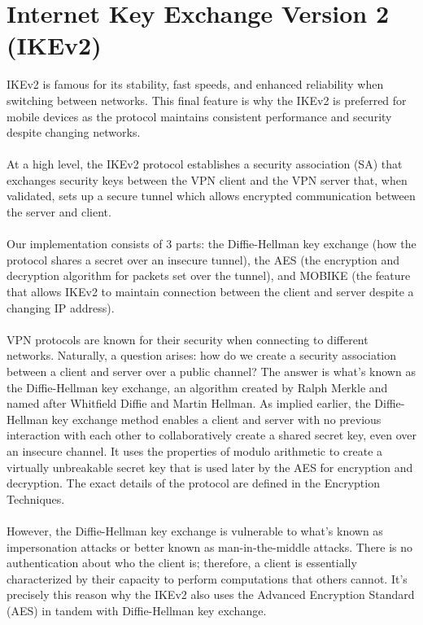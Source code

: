 \documentclass[runningheads]{llncs}
\begin{document}
\section{Internet Key Exchange Version 2 (IKEv2)}
IKEv2 is famous for its stability, fast speeds, and enhanced reliability when switching between networks. This final feature is why the IKEv2 is preferred for mobile devices as the protocol maintains consistent performance and security despite changing networks.\\
\\
 At a high level, the IKEv2 protocol establishes a security association (SA) that exchanges security keys between the VPN client and the VPN server that, when validated, sets up a secure tunnel which allows encrypted communication between the server and client. \\
\\
Our implementation consists of 3 parts: the Diffie-Hellman key exchange (how the protocol shares a secret over an insecure tunnel), the AES (the encryption and decryption algorithm for packets set over the tunnel), and MOBIKE (the feature that allows IKEv2 to maintain connection between the client and server despite a changing IP address).\\
\\
VPN protocols are known for their security when connecting to different networks. Naturally, a question arises: how do we create a security association between a client and server over a public channel? The answer is what’s known as the Diffie-Hellman key exchange, an algorithm created by Ralph Merkle and named after Whitfield Diffie and Martin Hellman. As implied earlier, the Diffie-Hellman key exchange method enables a client and server with no previous interaction with each other to collaboratively create a shared secret key, even over an insecure channel. It uses the properties of modulo arithmetic to create a virtually unbreakable secret key that is used later by the AES for encryption and decryption. The exact details of the protocol are defined in the Encryption Techniques.\\
 \\
 However, the Diffie-Hellman key exchange is vulnerable to what’s known as impersonation attacks or better known as man-in-the-middle attacks. There is no authentication about who the client is; therefore, a client is essentially characterized by their capacity to perform computations that others cannot. It’s precisely this reason why the IKEv2 also uses the Advanced Encryption Standard (AES) in tandem with Diffie-Hellman key exchange.\\
\end{document}
